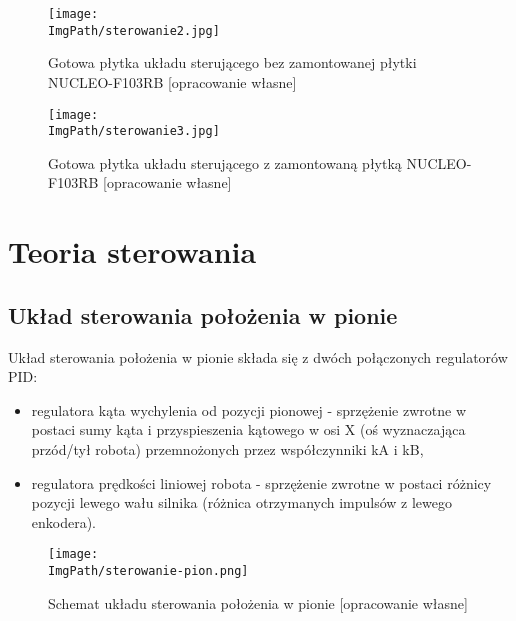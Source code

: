 \documentclass[a4paper,12pt,twoside,openany]{report}
\newcommand{\ImgPath}{.}
\begin{document}
\begin{figure}[!htbp]
	\begin{center}
\centering
\texttt{[image: \\ImgPath/sterowanie2.jpg]}
\end{center}
	\caption{Gotowa płytka układu sterującego bez zamontowanej płytki NUCLEO-F103RB [opracowanie własne]}
	\label{schematKomunikacji}
\end{figure}

\begin{figure}[!htbp]
	\begin{center}
\centering
\texttt{[image: \\ImgPath/sterowanie3.jpg]}
\end{center}
	\caption{Gotowa płytka układu sterującego z zamontowaną płytką NUCLEO-F103RB [opracowanie własne]}
	\label{schematKomunikacji}
\end{figure}

\newpage

\chapter{Teoria sterowania}

\section{Układ sterowania położenia w pionie}

Układ sterowania położenia w pionie składa się z dwóch połączonych regulatorów PID:
\begin{itemize}
\item regulatora kąta wychylenia od pozycji pionowej - sprzężenie zwrotne w postaci sumy kąta i przyspieszenia kątowego w osi X (oś wyznaczająca przód/tył robota) przemnożonych przez współczynniki kA i kB,
\item regulatora prędkości liniowej robota - sprzężenie zwrotne w postaci różnicy pozycji lewego wału silnika (różnica otrzymanych impulsów z lewego enkodera).
\end{itemize}

\begin{figure}[!htbp]
	\begin{center}
\centering
\texttt{[image: \\ImgPath/sterowanie-pion.png]}
\end{center}
	\caption{Schemat układu sterowania położenia w pionie [opracowanie własne]}
	\label{schematKomunikacji}
\end{figure}
\end{document}
